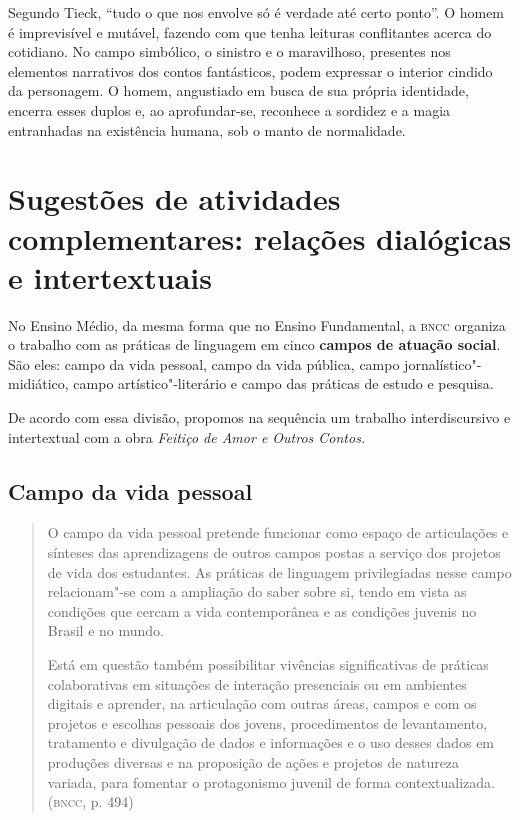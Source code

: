 \documentclass[11pt]{extarticle}
\begin{document}
Segundo Tieck, ``tudo o que nos envolve só é verdade até certo ponto''.
O homem é imprevisível e mutável, fazendo com que tenha leituras
conflitantes acerca do cotidiano. No campo simbólico, o sinistro e o
maravilhoso, presentes nos elementos narrativos dos contos fantásticos,
podem expressar o interior cindido da personagem. O homem, angustiado em
busca de sua própria identidade, encerra esses duplos e, ao
aprofundar-se, reconhece a sordidez e a magia entranhadas na existência
humana, sob o manto de normalidade.

\section{Sugestões de atividades complementares: relações dialógicas e
intertextuais}


No Ensino Médio, da mesma forma que no Ensino Fundamental, a \textsc{bncc}
organiza o trabalho com as práticas de linguagem em cinco \textbf{campos
de atuação social}. São eles: campo da vida pessoal, campo da vida
pública, campo jornalístico"-midiático, campo artístico"-literário e campo
das práticas de estudo e pesquisa.

De acordo com essa divisão, propomos na sequência um trabalho
interdiscursivo e intertextual com a obra \emph{Feitiço de Amor e Outros
Contos.}

\subsection{Campo da vida pessoal}

\begin{quote}
O campo da vida pessoal pretende funcionar como espaço de articulações
e sínteses das aprendizagens de outros campos postas a serviço dos
projetos de vida dos estudantes. As práticas de linguagem privilegiadas
nesse campo relacionam"-se com a ampliação do saber sobre si, tendo em
vista as condições que cercam a vida contemporânea e as condições
juvenis no Brasil e no mundo.

Está em questão também possibilitar vivências significativas de práticas
colaborativas em situações de interação presenciais ou em ambientes
digitais e aprender, na articulação com outras áreas, campos e com os
projetos e escolhas pessoais dos jovens, procedimentos de levantamento,
tratamento e divulgação de dados e informações e o uso desses dados em
produções diversas e na proposição de ações e projetos de natureza
variada, para fomentar o protagonismo juvenil de forma
contextualizada. (\textsc{bncc}, p. 494)
\end{quote}
\end{document}
